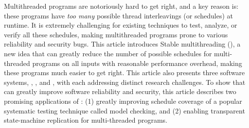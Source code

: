 
Multithreaded programs are notoriously hard to get right, and a key reason is: 
these programs have \emph{too many} possible thread interleavings (or 
schedules) at runtime. It is extremely challenging for existing techniques to
test, analyze, or verify all these schedules, making multithreaded programs 
prone to various reliability and security bugs. This article introduces
 Stable multithreading (\smt), a new idea that can greatly 
 reduce the number of possible schedules for multi-threaded programs on all  
 inputs with reasonable performance overhead, making 
 these programs much easier to get right. This article also presents three
 \smt software systems, \tern, \peregrine, and \parrot, with each addressing 
 distinct research challenges. To show that \smt can greatly improve software 
 reliability and security, this article describes two promising applications of \smt: 
 (1) greatly improving schedule coverage of a popular systematic testing technique 
 called model checking, and  (2) enabling transparent state-machine replication for multi-threaded programs.
